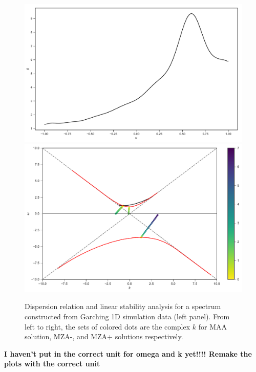 \documentclass[%
preprint,
 amsmath,amssymb,
 aps,
 prd
]{revtex4-1}
\begin{document}
\begin{figure}
     \includegraphics[width=\linewidth]{assets/spectGarchingPlt.pdf}
   \endminipage\hfill
   \includegraphics[width=\linewidth]{assets/spectGarchingDRLSAPlt.pdf}
   \endminipage\hfill
   \caption{Dispersion relation and linear stability analysis for a spectrum constructed from Garching 1D simulation data (left panel). From left to right, the sets of colored dots are the complex $k$ for MAA solution, MZA-, and MZA+ solutions respectively.
    }
   \label{fig-garching}
\end{figure}

{\color{red} \bf I haven't put in the correct unit for omega and k yet!!!! Remake the plots with the correct unit}


\end{document}
